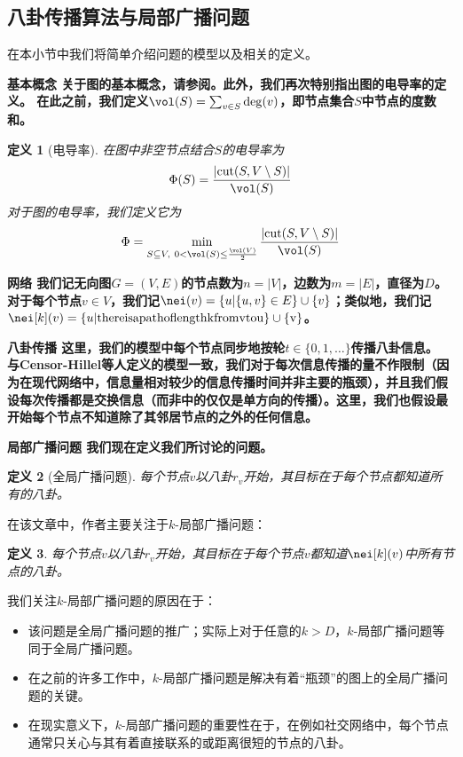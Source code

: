 \documentclass[12pt]{article}
\newtheorem{definition}{定义}[section]
\begin{document}
\subsection{八卦传播算法与局部广播问题}
在本小节中我们将简单介绍问题的模型以及相关的定义。

\bf{基本概念}\hspace{1em}
关于图的基本概念，请参阅\cite{DiestelGraphTheory2017}。此外，我们再次特别指出图的电导率的定义。
在此之前，我们定义$\vol(S)=\sum_{v\in S}\deg(v)$，即节点集合$S$中节点的度数和。
\begin{definition}[电导率\cite{JerrumApproximatingPermanent1989}]
  在图中非空节点结合$S$的电导率为
  \[
    \Phi(S) = \frac{|\textup{cut}(S, V\setminus S)|}{\textup{\vol}(S)}
  \]
  对于图的电导率，我们定义它为
  \[
    \Phi = \min_{S\subseteq V,\ 0<\textup{\vol}(S)\leq\frac{\textup{\vol}(V)}{2}} \frac{|\textup{cut}(S, V\setminus S)|}{\textup{\vol}(S)}
  \]
\end{definition}

\bf{网络} \hspace{1em}
我们记无向图$G=(V,E)$的节点数为$n=|V|$，边数为$m=|E|$，直径为$D$。
对于每个节点$v\in V$，我们记$\nei(v)=\{u | \{u, v\}\in E\} \cup \{v\}$；类似地，我们记$\nei[k](v)=\{u | \rm{there is a path of length } k \rm{ from } v \rm{ to } u\} \cup \{v\}$。

\bf{八卦传播}\hspace{1em}
这里，我们的模型中每个节点\bf{同步地}按轮$t\in\{0, 1, \dots\}$传播八卦信息。
与Censor-Hillel等人定义的模型一致，我们对于每次信息传播的量不作限制（因为在现代网络中，信息量相对较少的信息传播时间并非主要的瓶颈），并且我们假设每次传播都是\bf{交换}信息（而非\pullpush 中的仅仅是单方向的传播）。这里，我们也假设最开始每个节点不知道除了其邻居节点的之外的任何信息。

\bf{局部广播问题}\hspace{1em}
我们现在定义我们所讨论的问题。
\begin{definition}[全局广播问题]
  每个节点$v$以八卦$r_v$开始，其目标在于每个节点都知道所有的八卦。
\end{definition}
在该文章中，作者主要关注于$k$-局部广播问题：
\begin{definition}
  每个节点$v$以八卦$r_v$开始，其目标在于每个节点$v$都知道$\nei[k](v)$中所有节点的八卦。
\end{definition}
我们关注$k$-局部广播问题的原因在于：
\begin{itemize}
  \item 该问题是全局广播问题的推广；实际上对于任意的$k>D$，$k$-局部广播问题等同于全局广播问题。
  \item 在之前的许多工作中，$k$-局部广播问题是解决有着“瓶颈”的图上的全局广播问题的关键。
  \item 在现实意义下，$k$-局部广播问题的重要性在于，在例如社交网络中，每个节点通常只关心与其有着直接联系的或距离很短的节点的八卦。
\end{itemize}
\end{document}
